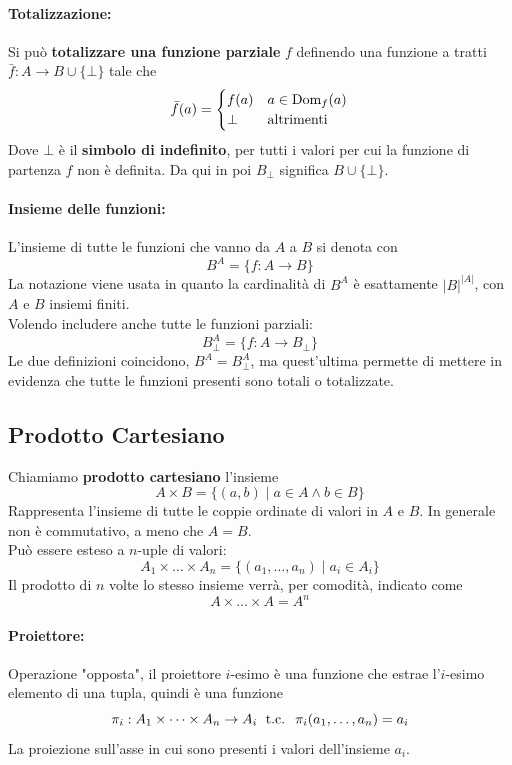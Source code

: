 \paragraph{Totalizzazione:} Si può \textbf{totalizzare una funzione parziale} $f$ definendo una funzione a tratti $\bar{f}: A \rightarrow B \cup \{\bot\}$ tale che
$$ 
\bar{f} (a) = \begin{cases}
	f(a) & a \in \text{Dom}_f(a) \\
	\bot & \text{altrimenti}
\end{cases}
$$
Dove $\bot$ è il \textbf{simbolo di indefinito}, per tutti i valori per cui la funzione di partenza $f$ non è definita. Da qui in poi $B_\bot$ significa $B \cup \{\bot\}$.\\

\paragraph{Insieme delle funzioni:} L'insieme di tutte le funzioni che vanno da $A$ a $B$ si denota con
$$ B^A = \{f: A \rightarrow B \} $$
La notazione viene usata in quanto la cardinalità di $B^A$ è esattamente $|B|^{|A|}$, con $A$ e $B$ insiemi finiti.\\
Volendo includere anche tutte le funzioni parziali: 
$$ B^A_\bot = \{f: A \rightarrow B_\bot \} $$
Le due definizioni coincidono, $B^A = B^A_\bot$, ma quest'ultima permette di mettere in evidenza che tutte le funzioni presenti sono totali o totalizzate.\\ 

\subsection{Prodotto Cartesiano}

Chiamiamo \textbf{prodotto cartesiano} l'insieme 
$$ A \times B = \{(a,b) \mid a \in A \wedge b \in B \} $$
Rappresenta l'insieme di tutte le coppie ordinate di valori in $A$ e $B$. In generale non è commutativo, a meno che $A=B$.\\

Può essere esteso a $n$-uple di valori:
$$ A_1 \times \dots \times A_n = \{(a_1, \dots, a_n) \mid a_i \in A_i\} $$
Il prodotto di $n$ volte lo stesso insieme verrà, per comodità, indicato come
$$ A \times \dots \times A = A^n $$

\paragraph{Proiettore:} Operazione "opposta", il proiettore $i$-esimo è una funzione che estrae l'$i$-esimo elemento di una tupla, quindi è una funzione
$$ \pi_i: A_1 \times \dots \times A_n \rightarrow A_i \; \text{ t.c. } \; \pi_i (a_1, \dots, a_n) = a_i $$
La proiezione sull'asse in cui sono presenti i valori dell'insieme $a_i$.\\

